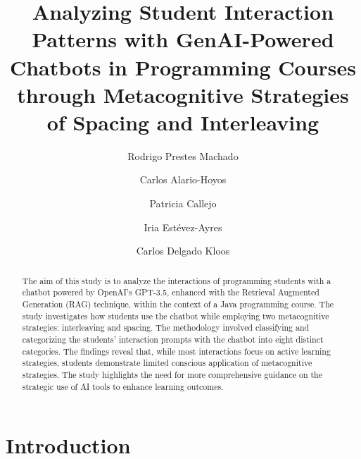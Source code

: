 \documentclass[runningheads]{llncs}
\begin{document}
%
\title{Analyzing Student Interaction Patterns with GenAI-Powered Chatbots in
Programming Courses through Metacognitive Strategies of Spacing and Interleaving
}
%
%
\author{
Rodrigo Prestes Machado \and
Carlos Alario-Hoyos \and
Patricia Callejo \and
Iria Estévez-Ayres \and
Carlos Delgado Kloos}
%
%
%
\maketitle              %
%
\begin{abstract}
The aim of this study is to analyze the interactions of programming students
with a chatbot powered by OpenAI's GPT-3.5, enhanced with the Retrieval
Augmented Generation (RAG) technique, within the context of a Java programming
course. The study investigates how students use the chatbot while employing
two metacognitive strategies: interleaving and spacing. The methodology involved
classifying and categorizing the students' interaction prompts with the chatbot
into eight distinct categories. The findings reveal that, while most
interactions focus on active learning strategies, students demonstrate limited
conscious application of metacognitive strategies. The study highlights the need
for more comprehensive guidance on the strategic use of AI tools to enhance
learning outcomes.

\end{abstract}
%
%
\section{Introduction}
\end{document}
